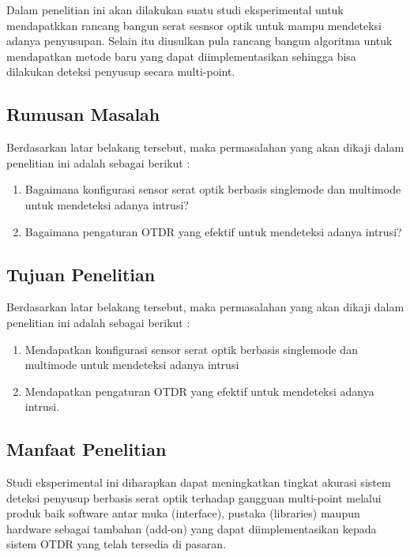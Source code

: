 \documentclass[12pt]{article}
\begin{document}
	Dalam penelitian ini akan dilakukan suatu studi eksperimental untuk mendapatkkan rancang bangun serat sesnsor optik untuk mampu mendeteksi adanya penyusupan.
	Selain itu diusulkan pula rancang bangun algoritma untuk mendapatkan metode baru yang dapat diimplementasikan sehingga bisa dilakukan deteksi penyusup secara multi-point.
	
	
	
	\subsection{Rumusan Masalah}
	
	Berdasarkan latar belakang tersebut, maka permasalahan yang akan dikaji dalam penelitian ini adalah sebagai berikut :
	
	\begin{enumerate}
		\item Bagaimana konfigurasi sensor serat optik berbasis singlemode dan multimode untuk mendeteksi adanya intrusi?
		\item Bagaimana pengaturan OTDR yang efektif untuk mendeteksi adanya intrusi?
	\end{enumerate}



	\subsection{Tujuan Penelitian}

	Berdasarkan latar belakang tersebut, maka permasalahan yang akan dikaji dalam penelitian ini adalah sebagai berikut :
	
	\begin{enumerate}
		\item Mendapatkan konfigurasi sensor serat optik berbasis  singlemode dan multimode untuk mendeteksi adanya intrusi
		\item Mendapatkan pengaturan OTDR yang efektif untuk mendeteksi adanya intrusi. 
	\end{enumerate}


	\subsection{Manfaat Penelitian}
	
	Studi eksperimental ini diharapkan dapat meningkatkan tingkat akurasi sistem deteksi penyusup berbasis serat optik terhadap gangguan multi-point melalui produk baik software antar muka (interface), pustaka (libraries) maupun hardware sebagai tambahan (add-on) yang dapat diimplementasikan kepada sistem OTDR yang telah tersedia di pasaran.
	
\end{document}
